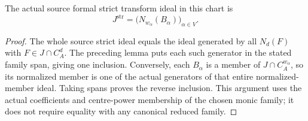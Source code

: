 \begin{theorem}
\label{hir:actual-formal-strict-ideal-monic-family-generators}
\leanok
The actual source formal strict transform ideal in this chart is
\[
 J^{\mathrm{str}}=\bigl(N_{w_\alpha}(B_\alpha)\bigr)_{\alpha\in V}.
\]
\end{theorem}
\begin{proof}
The whole source strict ideal equals the ideal generated by all
$N_d(F)$ with $F\in J\cap C_A^d$. The preceding lemma puts each such
generator in the stated family span, giving one inclusion. Conversely,
each $B_\alpha$ is a member of $J\cap C_A^{w_\alpha}$, so its normalized
member is one of the actual generators of that entire normalized-member
ideal. Taking spans proves the reverse inclusion. This argument uses
the actual coefficients and centre-power membership of the chosen monic
family; it does not require equality with any canonical reduced family.
\end{proof}
